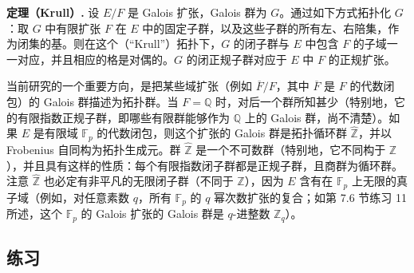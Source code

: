 \noindent\textbf{定理（Krull）.} 设 $E/F$ 是 Galois 扩张，Galois 群为 $G$。通过如下方式拓扑化 $G$：取 $G$ 中有限扩张 $F$ 在 $E$ 中的固定子群，以及这些子群的所有左、右陪集，作为闭集的基。则在这个（“Krull”）拓扑下，$G$ 的闭子群与 $E$ 中包含 $F$ 的子域一一对应，并且相应的格是对偶的。$G$ 的闭正规子群对应于 $E$ 中 $F$ 的正规扩张。

当前研究的一个重要方向，是把某些域扩张（例如 $\overline F/F$，其中 $\overline F$ 是 $F$ 的代数闭包）的 Galois 群描述为拓扑群。当 $F=\mathbb Q$ 时，对后一个群所知甚少（特别地，它的有限指数正规子群，即哪些有限群能够作为 $\mathbb Q$ 上的 Galois 群，尚不清楚）。如果 $E$ 是有限域 $\mathbb F_p$ 的代数闭包，则这个扩张的 Galois 群是拓扑循环群 $\widehat{\mathbb Z}$，并以 Frobenius 自同构为拓扑生成元。群 $\widehat{\mathbb Z}$ 是一个不可数群（特别地，它不同构于 $\mathbb Z$），并且具有这样的性质：每个有限指数闭子群都是正规子群，且商群为循环群。注意 $\widehat{\mathbb Z}$ 也必定有非平凡的无限闭子群（不同于 $\mathbb Z$），因为 $E$ 含有在 $\mathbb F_p$ 上无限的真子域（例如，对任意素数 $q$，所有 $\mathbb F_p$ 的 $q$ 幂次数扩张的复合；如第 7.6 节练习 11 所述，这个 $\mathbb F_p$ 的 Galois 扩张的 Galois 群是 $q$-进整数 $\mathbb Z_q$）。

\subsection*{练习}

